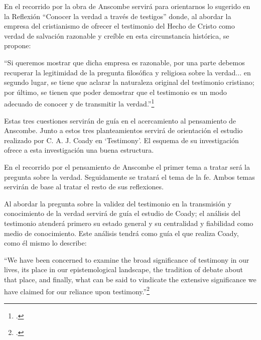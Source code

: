 \documentclass[12pt]{article}
\begin{document}
{En el recorrido por la obra de Anscombe servirá para orientarnos lo sugerido en la Reflexión ``Conocer la verdad a través de testigos'' donde, al abordar la empresa del cristianismo de ofrecer el testimonio del Hecho de Cristo como verdad de salvación razonable y creíble en esta circunstancia histórica, se propone:

``Si queremos mostrar que dicha empresa es razonable, por una parte debemos recuperar la legitimidad de la pregunta filosófica y religiosa sobre la verdad... en segundo lugar, se tiene que aclarar la naturaleza original del testimonio cristiano; por último, se tienen que poder demostrar que el testimonio es un modo adecuado de conocer y de transmitir la verdad.''\footcite[p.~267]{pradesmulticr}

Estas tres cuestiones servirán de guía en el acercamiento al pensamiento de Anscombe. Junto a estos tres planteamientos servirá de orientación el estudio realizado por C. A. J. Coady en `Testimony'. El esquema de su investigación ofrece a esta investigación una buena estructura.  

En el recorrido por el pensamiento de Anscombe el primer tema a tratar será la pregunta sobre la verdad. Seguidamente se tratará el tema de la fe. Ambos temas servirán de base al tratar el resto de sus reflexiones.

Al abordar la pregunta sobre la validez del testimonio en la transmisión y conocimiento de la verdad servirá de guía el estudio de Coady; el análisis del testimonio atenderá primero su estado general y su centralidad y fiabilidad como medio de conocimiento. Este análisis tendrá como guía el que realiza Coady, como él mismo lo describe:

``We have been concerned to examine the broad significance of testimony in our lives, its place in our epistemological landscape, the tradition of debate about that place, and finally, what can be said to vindicate the extensive significance we have claimed for our reliance upon testimony.''\footcite[p.~175]{testcoady}

}
\end{document}
